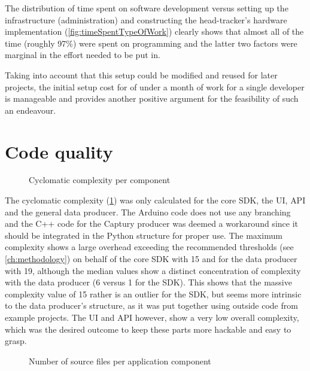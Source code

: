The distribution of time spent on software development versus setting up the infrastructure (administration) and constructing the head-tracker's hardware implementation (\ref{fig:timeSpentTypeOfWork}) clearly shows that almost all of the time (roughly 97\%) were spent on programming and the latter two factors were marginal in the effort needed to be put in.

Taking into account that this setup could be modified and reused for later projects, the initial setup cost for of under a month of work for a single developer is manageable and provides another positive argument for the feasibility of such an endeavour.

\section{Code quality}

\begin{figure}[h]
\centering

\caption[Cyclomatic complexity]{Cyclomatic complexity per component\protect}
\label{fig:cyclomaticComplexity}
\end{figure}

The cyclomatic complexity (\ref{fig:cyclomaticComplexity}) was only calculated for the core \ac{SDK}, the \ac{UI}, \ac{API} and the general data producer.
The Arduino code does not use any branching and the C++ code for the Captury producer was deemed a workaround since it should be integrated in the Python structure for proper use.
The maximum complexity shows a large overhead exceeding the recommended thresholds (see \autoref{ch:methodology}) on behalf of the core \ac{SDK} with 15 and for the data producer with 19, although the median values show a distinct concentration of complexity with the data producer (6 versus 1 for the \ac{SDK}).
This shows that the massive complexity value of 15 rather is an outlier for the \ac{SDK}, but seems more intrinsic to the data producer's structure, as it was put together using outside code from example projects.
The \ac{UI} and \ac{API} however, show a very low overall complexity, which was the desired outcome to keep these parts more hackable and easy to grasp.

\begin{figure}[h]
\centering

\caption[File count]{Number of source files per application component\protect}
\label{fig:fileCount}
\end{figure}

